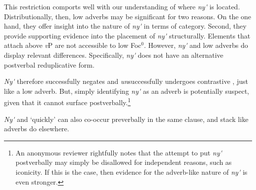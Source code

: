 \documentclass[output=paper,modfonts,nonflat,
colorlinks, citecolor=brown,
draftmode
]{langsci/langscibook}
\begin{document}
\label{ex:duncan-et-al:20}
\z

\noindent This restriction comports well with our understanding of where \textit{ny\'{\textturnv}\ng} is located. Distributionally, then, low adverbs may be significant for two reasons. On the one hand, they offer insight into the nature of \textit{ny\'{\textturnv}\ng} in terms of category. Second, they provide supporting evidence into the placement of \textit{ny\'{\textturnv}\ng} structurally. Elements that attach above \textit{v}P are not accessible to low Foc$^0$. However, \textit{ny\'{\textturnv}\ng} and low adverbs do display relevant differences. Specifically, \textit{ny\'{\textturnv}\ng} does not have an alternative postverbal reduplicative form.

\label{ex:duncan-et-al:21}
\z

\noindent \textit{Ny\'{\textturnv}\ng} therefore successfully negates and \textit{un}successfully undergoes contrastive , just like a low adverb. But, simply identifying \textit{ny\'{\textturnv}\ng} as an adverb is potentially suspect, given that it cannot surface postverbally.\footnote{An anonymous reviewer rightfully notes that the attempt to put \textit{ny\'{\textturnv}\ng} postverbally may simply be disallowed for independent reasons, such as iconicity. If this is the case, then evidence for the adverb-like nature of \textit{ny\'{\textturnv}\ng} is even stronger.}

\textit{Ny\'{\textturnv}\ng} and `quickly' can also co-occur preverbally in the same clause, and stack like adverbs do elsewhere.

\ea\label{ex:duncan-et-al:22}
\z
\z
\end{document}
